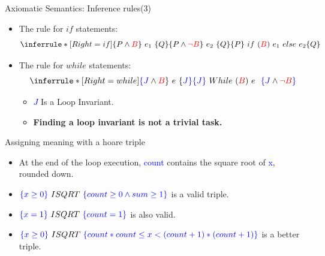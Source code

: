 \begin{frame}{Axiomatic Semantics: Inference rules(3)}
\begin{itemize}
	\item The rule for $if$ statements:
	$$
	\inferrule*[Right=if]
	{ \{P \wedge \color{red}B \color{black}\}~e_1~\{Q\}\\ \{P \wedge \color{red}\neg B \color{black}\}~e_2~\{Q\}}{\{P\}~if~(\color{red}B\color{black})~e_1~else~e_2\{Q\}}
	$$
	
		\item The rule for $while$ statements:
$$
\inferrule*[Right=while]
{ \color{blue}\{J  \color{black} \wedge \color{red}B \color{black}\}~e~\{\color{blue} J\}}{\color{blue}\{ J\}~\color{black}While~(\color{red}B\color{black})~e~~ \color{blue}\{J \color{black} \wedge \color{red}\neg B \color{blue}\}}
$$
\begin{itemize}
	\item \textcolor{blue}{$J$} Is a Loop Invariant.
	\item \textbf{Finding a loop invariant is not a trivial task.}
\end{itemize}
\end{itemize}
\end{frame}
\begin{frame}{Assigning meaning with a hoare triple}
\begin{exampleblock}
	
	\begin{itemize}
		\item At the end of the loop execution, \textcolor{blue}{count} contains the square root of \textcolor{blue}{x}, rounded down.
		
	
		\item $\color{blue}\{ x \geq 0 \} \color{black} ~ ISQRT ~ \color{blue}\{ count \geq 0 \wedge sum \geq 1\} $ is a valid triple.
		\item $\color{blue}\{ x = 1 \} ~\color{black} ISQRT ~ \color{blue}\{ count = 1\} $ is also valid.
		\item $\color{blue}\{ x \geq 0 \} ~\color{black} ISQRT ~\color{blue} \{ count*count \leq x < (count+1)*(count+1)\} $ is a better triple.
		
		
	\end{itemize} 
\end{exampleblock}
\end{frame}

